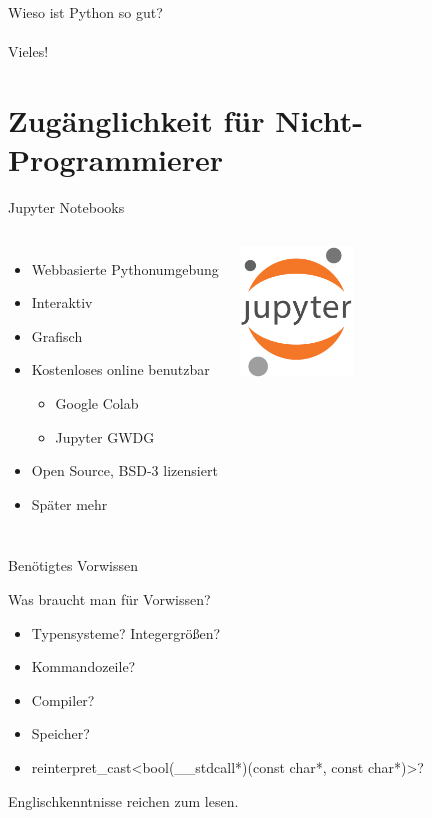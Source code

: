 \documentclass{beamer}
\begin{document}
\begin{frame}
\begin{center}
{ \Huge Wieso ist Python so gut?}\\~\\
\pause
Vieles!
\end{center}
\end{frame}

\section{Zug\"anglichkeit f\"ur Nicht-Programmierer}

\begin{frame}{Jupyter Notebooks}
\begin{columns}[onlytextwidth,T]
\column{\dimexpr\linewidth-30mm-5mm}
\begin{itemize}
\item Webbasierte Pythonumgebung
\item Interaktiv
\item Grafisch
\item Kostenloses online benutzbar
\begin{itemize}
\item Google Colab
\item Jupyter GWDG
\end{itemize}
\item Open Source, BSD-3 lizensiert
\item Sp\"ater mehr
\end{itemize}
\column{30mm}
\includegraphics[width=30mm]{./assets/jupyter.png}
\end{columns}
\end{frame}

\begin{frame}{Ben\"otigtes Vorwissen}
\begin{center}
\LARGE Was braucht man f\"ur Vorwissen?
\end{center}
\begin{itemize}
\item Typensysteme? Integergr\"o\ss{}en?
\item Kommandozeile?
\item Compiler?
\item Speicher?
\item reinterpret\_cast\textless bool(\_\_stdcall*)(const char*, const char*)\textgreater?
\end{itemize}
\begin{center}
\Large Englischkenntnisse reichen zum lesen.
\end{center}
\end{frame}
\end{document}
